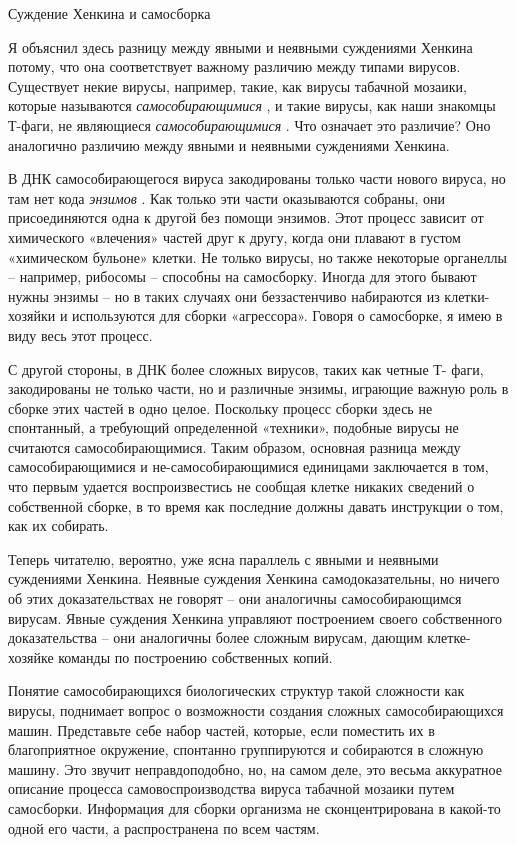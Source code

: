 \documentclass[../main.tex]{subfiles}
\begin{document}
Суждение Хенкина и самосборка

Я объяснил здесь разницу между явными и неявными суждениями Хенкина потому, что она соответствует важному различию между типами вирусов. Существует некие вирусы, например, такие, как вирусы табачной мозаики, которые называются \emph{самособирающимися} , и такие вирусы, как наши знакомцы Т-фаги, не являющиеся \emph{самособирающимися} . Что означает это различие? Оно аналогично различию между явными и неявными суждениями Хенкина.

В ДНК самособирающегося вируса закодированы только части нового вируса, но там нет кода \emph{энзимов} . Как только эти части оказываются собраны, они присоединяются одна к другой без помощи энзимов. Этот процесс зависит от химического «влечения» частей друг к другу, когда они плавают в густом «химическом бульоне» клетки. Не только вирусы, но также некоторые органеллы \--- например, рибосомы \--- способны на самосборку. Иногда для этого бывают нужны энзимы \--- но в таких случаях они беззастенчиво набираются из клетки-хозяйки и используются для сборки «агрессора». Говоря о самосборке, я имею в виду весь этот процесс.

С другой стороны, в ДНК более сложных вирусов, таких как четные Т- фаги, закодированы не только части, но и различные энзимы, играющие важную роль в сборке этих частей в одно целое. Поскольку процесс сборки здесь не спонтанный, а требующий определенной «техники», подобные вирусы не считаются самособирающимися. Таким образом, основная разница между самособирающимися и не-самособирающимися единицами заключается в том, что первым удается воспроизвестись не сообщая клетке никаких сведений о собственной сборке, в то время как последние должны давать инструкции о том, как их собирать.

Теперь читателю, вероятно, уже ясна параллель с явными и неявными суждениями Хенкина. Неявные суждения Хенкина самодоказательны, но ничего об этих доказательствах не говорят \--- они аналогичны самособирающимся вирусам. Явные суждения Хенкина управляют построением своего собственного доказательства \--- они аналогичны более сложным вирусам, дающим клетке-хозяйке команды по построению собственных копий.

Понятие самособирающихся биологических структур такой сложности как вирусы, поднимает вопрос о возможности создания сложных самособирающихся машин. Представьте себе набор частей, которые, если поместить их в благоприятное окружение, спонтанно группируются и собираются в сложную машину. Это звучит неправдоподобно, но, на самом деле, это весьма аккуратное описание процесса самовоспроизводства вируса табачной мозаики путем самосборки. Информация для сборки организма не сконцентрирована в какой-то одной его части, а распространена по всем частям.
\end{document}
